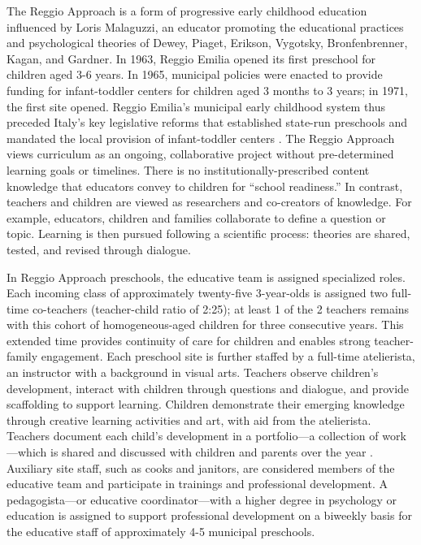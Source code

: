 The Reggio Approach is a form of progressive early childhood education influenced by Loris Malaguzzi, an educator promoting the educational practices and psychological theories of Dewey, Piaget, Erikson, Vygotsky, Bronfenbrenner, Kagan, and Gardner. In 1963, Reggio Emilia opened its first preschool for children aged 3-6 years. In 1965, municipal policies were enacted to provide funding for infant-toddler centers for children aged 3 months to 3 years; in 1971, the first site opened. Reggio Emilia's municipal early childhood system thus preceded Italy's key legislative reforms that established state-run preschools and mandated the local provision of infant-toddler centers \citep{Cagliari-etal-eds_2016_BOOK_Loris-Malaguzzi}. The Reggio Approach views curriculum as an ongoing, collaborative project without pre-determined learning goals or timelines. There is no institutionally-prescribed content knowledge that educators convey to children for ``school readiness.'' In contrast, teachers and children are viewed as researchers and co-creators of knowledge. For example, educators, children and families collaborate to define a question or topic. Learning is then pursued following a scientific process: theories are shared, tested, and revised through dialogue. 

In Reggio Approach preschools, the educative team is assigned specialized roles. Each incoming class of approximately twenty-five 3-year-olds is assigned two full-time co-teachers (teacher-child ratio of 2:25); at least 1 of the 2 teachers remains with this cohort of homogeneous-aged children for three consecutive years. This extended time provides continuity of care for children and enables strong teacher-family engagement. Each preschool site is further staffed by a full-time atelierista, an instructor with a background in visual arts. Teachers observe children's development, interact with children through questions and dialogue, and provide scaffolding to support learning. Children demonstrate their emerging knowledge through creative learning activities and art, with aid from the atelierista. Teachers document each child's development in a portfolio---a collection of work---which is shared and discussed with children and parents over the year \citep{Rinaldi_2006_ReggioEmilia_BOOK,Giudici-Nicolosi_2014_Reggio-Approach}. Auxiliary site staff, such as cooks and janitors, are considered members of the educative team and participate in trainings and professional development. A pedagogista---or educative coordinator---with a higher degree in psychology or education is assigned to support professional development on a biweekly basis for the educative staff of approximately 4-5 municipal preschools. 

